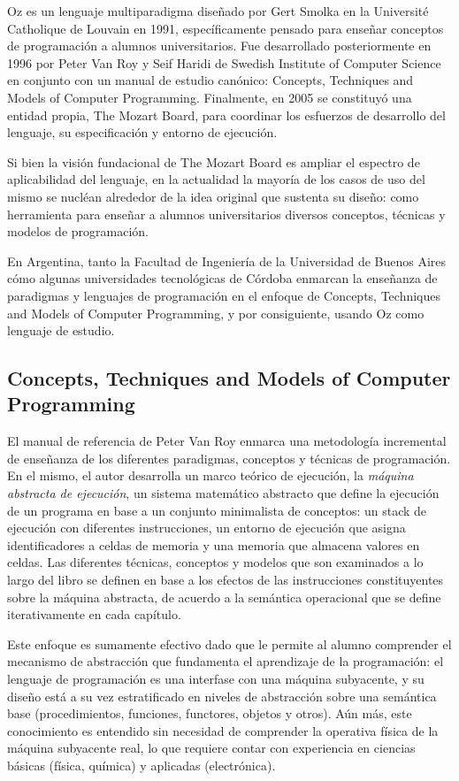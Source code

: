\documentclass[a4paper,11pt]{article}
\begin{document}
Oz es un lenguaje multiparadigma diseñado por Gert Smolka en la Université
Catholique de Louvain en 1991, específicamente pensado para enseñar conceptos
de programación a alumnos universitarios. Fue desarrollado posteriormente en
1996 por Peter Van Roy y Seif Haridi de Swedish Institute of Computer Science
en conjunto con un manual de estudio canónico: Concepts, Techniques and Models
of Computer Programming. Finalmente, en 2005 se constituyó una entidad propia,
The Mozart Board, para coordinar los esfuerzos de desarrollo del lenguaje, su
especificación y entorno de ejecución.

Si bien la visión fundacional de The Mozart Board es ampliar el espectro de
aplicabilidad del lenguaje, en la actualidad la mayoría de los casos de uso del
mismo se nucléan alrededor de la idea original que sustenta su diseño: como
herramienta para enseñar a alumnos universitarios diversos conceptos, técnicas
y modelos de programación.

En Argentina, tanto la Facultad de Ingeniería de la Universidad de Buenos Aires
cómo algunas universidades tecnológicas de Córdoba enmarcan la enseñanza de
paradigmas y lenguajes de programación en el enfoque de Concepts, Techniques
and Models of Computer Programming, y por consiguiente, usando Oz como lenguaje
de estudio.

\subsection{Concepts, Techniques and Models of Computer Programming}

El manual de referencia de Peter Van Roy enmarca una metodología incremental de
enseñanza de los diferentes paradigmas, conceptos y técnicas de programación.
En el mismo, el autor desarrolla un marco teórico de ejecución, la
\emph{máquina abstracta de ejecución}, un sistema matemático abstracto que
define la ejecución de un programa en base a un conjunto minimalista de
conceptos: un stack de ejecución con diferentes instrucciones, un entorno de
ejecución que asigna identificadores a celdas de memoria y una memoria que
almacena valores en celdas. Las diferentes técnicas, conceptos y modelos que
son examinados a lo largo del libro se definen en base a los efectos de las
instrucciones constituyentes sobre la máquina abstracta, de acuerdo a la
semántica operacional que se define iterativamente en cada capítulo.

Este enfoque es sumamente efectivo dado que le permite al alumno comprender el
mecanismo de abstracción que fundamenta el aprendizaje de la programación: el
lenguaje de programación es una interfase con una máquina subyacente, y su
diseño está a su vez estratificado en niveles de abstracción sobre una
semántica base (procedimientos, funciones, functores, objetos y otros). Aún
más, este conocimiento es entendido sin necesidad de comprender la operativa
física de la máquina subyacente real, lo que requiere contar con experiencia en
ciencias básicas (física, química) y aplicadas (electrónica).
\end{document}
